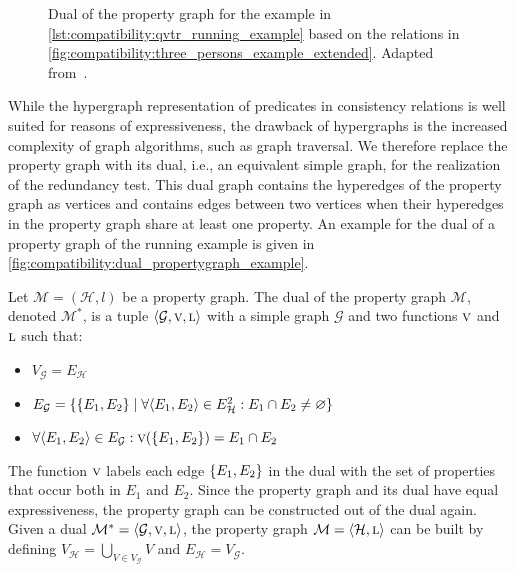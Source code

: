 \begin{figure}
    \centering
    
    
    \caption[Dual of the property graph for the running example]{Dual of the property graph for the \qvtr example in \autoref{lst:compatibility:qvtr_running_example} based on the relations in \autoref{fig:compatibility:three_persons_example_extended}. Adapted from~.}
    \label{fig:compatibility:dual_propertygraph_example}
\end{figure}

While the hypergraph representation of predicates in consistency relations is well suited for reasons of expressiveness, the drawback of hypergraphs is the increased complexity of graph algorithms, such as graph traversal.
We therefore replace the property graph with its dual, i.e., an equivalent simple graph, for the realization of the redundancy test.
This dual graph contains the hyperedges of the property graph as vertices and contains edges between two vertices when their hyperedges in the property graph share at least one property.
An example for the dual of a property graph of the running example is given in \autoref{fig:compatibility:dual_propertygraph_example}.


\begin{definition}
Let $\mathcal{M} = (\mathcal{H}, l)$ be a property graph. The dual of the property graph $\mathcal{M}$, denoted $\mathcal{M^{*}}$, is a tuple $\langle \mathcal{G}, \textsc{v}, \textsc{l} \rangle$ with a simple graph $\mathcal{G}$ and two functions $\textsc{v}$ and $\textsc{l}$ such that:
    \begin{itemize}
        \item $V_{\mathcal{G}} = E_{\mathcal{H}}$
        \item $E_{\mathcal{G}} = \setted{\setted{E_1, E_2} \mid \forall \tupled{E_1, E_2} \in E_{\mathcal{H}}^2 : E_1 \cap E_2 \neq \varnothing}$
        \item $\forall \tupled{E_1, E_2} \in E_{\mathcal{G}} : \function{v}(\setted{E_1, E_2}) = E_1 \cap E_2$
    \end{itemize}
\end{definition}

The function $\textsc{v}$ labels each edge $\{ E_1, E_2 \}$ in the dual with the set of properties that occur both in $E_1$ and $E_2$.
Since the property graph and its dual have equal expressiveness, the property graph can be constructed out of the dual again.
Given a dual $\mathcal{M^{*}} = \langle \mathcal{G}, \textsc{v}, \textsc{l} \rangle$, the property graph $\mathcal{M} = \langle \mathcal{H}, \textsc{l} \rangle$ can be built by defining $V_{\mathcal{H}} = \bigcup_{V \in V_{\mathcal{G}}} V$ and $E_{\mathcal{H}} = V_{\mathcal{G}}$. 

